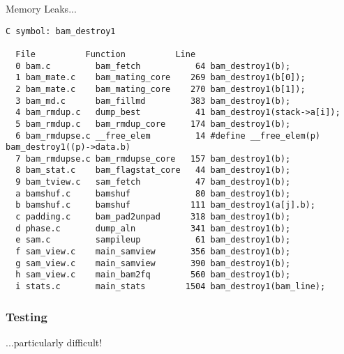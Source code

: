 Memory Leaks...
\begin{verbatim} 
C symbol: bam_destroy1

  File          Function          Line
  0 bam.c         bam_fetch           64 bam_destroy1(b);
  1 bam_mate.c    bam_mating_core    269 bam_destroy1(b[0]);
  2 bam_mate.c    bam_mating_core    270 bam_destroy1(b[1]);
  3 bam_md.c      bam_fillmd         383 bam_destroy1(b);
  4 bam_rmdup.c   dump_best           41 bam_destroy1(stack->a[i]);
  5 bam_rmdup.c   bam_rmdup_core     174 bam_destroy1(b);
  6 bam_rmdupse.c __free_elem         14 #define __free_elem(p) bam_destroy1((p)->data.b)
  7 bam_rmdupse.c bam_rmdupse_core   157 bam_destroy1(b);
  8 bam_stat.c    bam_flagstat_core   44 bam_destroy1(b);
  9 bam_tview.c   sam_fetch           47 bam_destroy1(b);
  a bamshuf.c     bamshuf             80 bam_destroy1(b);
  b bamshuf.c     bamshuf            111 bam_destroy1(a[j].b);
  c padding.c     bam_pad2unpad      318 bam_destroy1(b);
  d phase.c       dump_aln           341 bam_destroy1(b);
  e sam.c         sampileup           61 bam_destroy1(b);
  f sam_view.c    main_samview       356 bam_destroy1(b);
  g sam_view.c    main_samview       390 bam_destroy1(b);
  h sam_view.c    main_bam2fq        560 bam_destroy1(b);
  i stats.c       main_stats        1504 bam_destroy1(bam_line);
\end{verbatim}

\subsubsection{Testing}
...particularly difficult!
